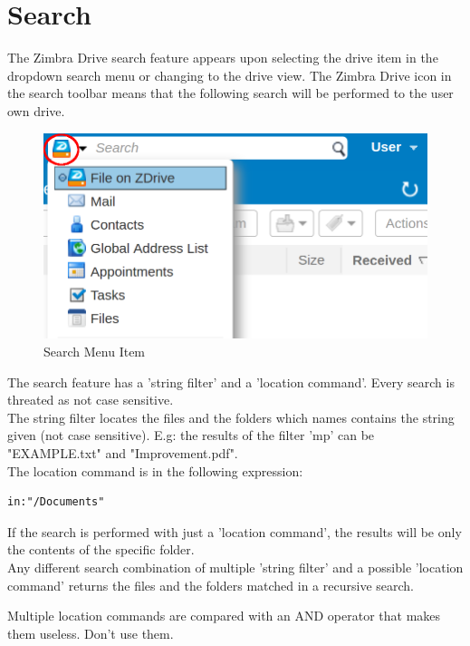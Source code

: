 \section{Search}
The Zimbra Drive search feature appears upon selecting the drive item in the dropdown search menu or changing to the drive view.
The Zimbra Drive icon in the search toolbar means that the following search will be performed to the user own drive.
\begin{figure}[htbp,!h] 
\centering 
\includegraphics[scale=0.25]{src/images/ZD-searchMenu.png} 
\caption{Search Menu Item} 
\label{==fig:searchMenu==}
\end{figure}

The search feature has a 'string filter' and a 'location command'. 
Every search is threated as not case sensitive. \\
The string filter locates the files and the folders which names contains the string given (not case sensitive).
E.g: the results of the filter 'mp' can be "EXAMPLE.txt" and "Improvement.pdf".\\

The location command is in the following expression:
\begin{verbatim}
in:"/Documents"
\end{verbatim}
If the search is performed with just a 'location command', the results will be only the contents of the specific folder.\\

Any different search combination of multiple 'string filter' and a possible 'location command' returns 
the files and the folders matched in a recursive search.

\begin{warning}
    Multiple location commands are compared with an AND operator that makes them useless. Don't use them.
\end{warning}
